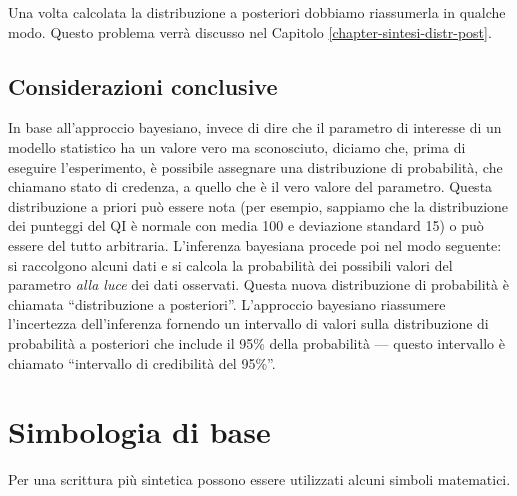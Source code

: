\documentclass[
]{memoir}
\theoremstyle{definition}
\theoremstyle{definition}
\theoremstyle{definition}
\theoremstyle{definition}
\theoremstyle{remark}
\begin{document}
Una volta calcolata la distribuzione a posteriori dobbiamo riassumerla in qualche modo. Questo problema verrà discusso nel Capitolo \ref{chapter-sintesi-distr-post}.

\hypertarget{considerazioni-conclusive}{%
\section*{Considerazioni conclusive}\label{considerazioni-conclusive}}

In base all'approccio bayesiano, invece di dire che il parametro di interesse di un modello statistico ha un valore vero ma sconosciuto, diciamo che, prima di eseguire l'esperimento, è possibile assegnare una distribuzione di probabilità, che chiamano stato di credenza, a quello che è il vero valore del parametro. Questa distribuzione a priori può essere nota (per esempio, sappiamo che la distribuzione dei punteggi del QI è normale con media 100 e deviazione standard 15) o può essere del tutto arbitraria. L'inferenza bayesiana procede poi nel modo seguente: si raccolgono alcuni dati e si calcola la probabilità dei possibili valori del parametro \emph{alla luce} dei dati osservati. Questa nuova distribuzione di probabilità è chiamata ``distribuzione a posteriori''. L'approccio bayesiano riassumere l'incertezza dell'inferenza fornendo un intervallo di valori sulla distribuzione di probabilità a posteriori che include il 95\% della probabilità --- questo intervallo è chiamato ``intervallo di credibilità del 95\%''.

\hypertarget{appendix-appendix}{%
\appendix}


\hypertarget{simbologia-di-base}{%
\chapter{Simbologia di base}\label{simbologia-di-base}}

Per una scrittura più sintetica possono essere utilizzati alcuni simboli
matematici.
\end{document}
